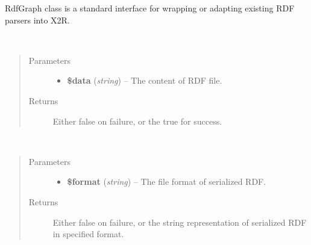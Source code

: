 \documentclass[letterpaper,10pt,english]{sphinxmanual}
\begin{document}
\begin{fulllineitems}
\label{docs/api:RdfGraph}
RdfGraph class is a standard interface for wrapping or adapting existing RDF parsers into X2R.

\begin{fulllineitems}
\label{docs/api:RdfGraph::parseRdf}~\begin{quote}\begin{description}
\item[{Parameters}] \leavevmode\begin{itemize}
\item {} 
\textbf{\$data} (\emph{string}) -- The content of RDF file.

\end{itemize}

\item[{Returns}] \leavevmode
Either false on failure, or the true for success.

\end{description}\end{quote}

\end{fulllineitems}


\begin{fulllineitems}
\label{docs/api:RdfGraph::serializeRdfAs}~\begin{quote}\begin{description}
\item[{Parameters}] \leavevmode\begin{itemize}
\item {} 
\textbf{\$format} (\emph{string}) -- The file format of serialized RDF.

\end{itemize}

\item[{Returns}] \leavevmode
Either false on failure, or the string representation of serialized RDF in specified format.

\end{description}\end{quote}

\end{fulllineitems}


\end{fulllineitems}
\end{document}
